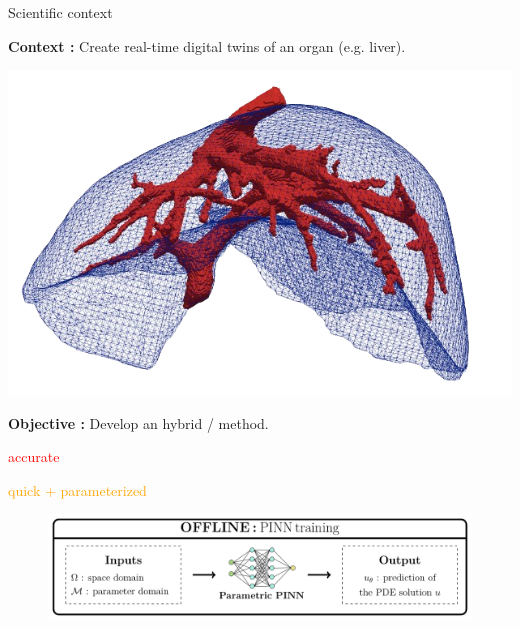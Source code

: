 \begin{frame}{Scientific context}
	\begin{minipage}{0.75\linewidth}
		\textbf{Context :} Create real-time digital twins of an organ (e.g. liver).
	\end{minipage}
	\begin{minipage}{0.21\linewidth}
		\vspace{-20pt}
		\includegraphics[width=\linewidth]{images/intro/liver.png}
	\end{minipage}
	
	\vspace{5pt}
	\textbf{Objective :} Develop an hybrid  /  method.
	
	\vspace{1pt}
	\small
	\hspace{130pt} \begin{minipage}{0.14\linewidth}
		\textcolor{red}{accurate}
	\end{minipage} \hspace{8pt} \begin{minipage}{0.3\linewidth}
		\textcolor{orange}{quick + parameterized}
	\end{minipage}

	\begin{figure}[!ht]
		\centering
		\includegraphics[width=0.7\linewidth]{images/intro/pipeline/offline.pdf}


\end{figure}
\end{frame}
